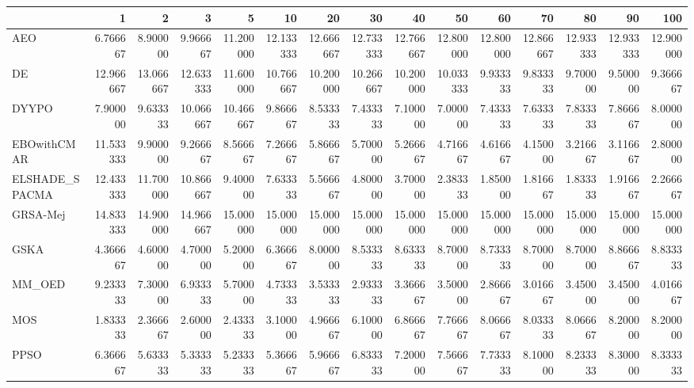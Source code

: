 \begin{tabular}{lrrrrrrrrrrrrrr}
\toprule
{} &        1   &        2   &        3   &        5   &        10  &        20  &        30  &        40  &        50  &        60  &        70  &        80  &        90  &        100 \\
\midrule
AEO            &   6.766667 &   8.900000 &   9.966667 &  11.200000 &  12.133333 &  12.666667 &  12.733333 &  12.766667 &  12.800000 &  12.800000 &  12.866667 &  12.933333 &  12.933333 &  12.900000 \\
DE             &  12.966667 &  13.066667 &  12.633333 &  11.600000 &  10.766667 &  10.200000 &  10.266667 &  10.200000 &  10.033333 &   9.933333 &   9.833333 &   9.700000 &   9.500000 &   9.366667 \\
DYYPO          &   7.900000 &   9.633333 &  10.066667 &  10.466667 &   9.866667 &   8.533333 &   7.433333 &   7.100000 &   7.000000 &   7.433333 &   7.633333 &   7.833333 &   7.866667 &   8.000000 \\
EBOwithCMAR    &  11.533333 &   9.900000 &   9.266667 &   8.566667 &   7.266667 &   5.866667 &   5.700000 &   5.266667 &   4.716667 &   4.616667 &   4.150000 &   3.216667 &   3.116667 &   2.800000 \\
ELSHADE\_SPACMA &  12.433333 &  11.700000 &  10.866667 &   9.400000 &   7.633333 &   5.566667 &   4.800000 &   3.700000 &   2.383333 &   1.850000 &   1.816667 &   1.833333 &   1.916667 &   2.266667 \\
GRSA-Mej       &  14.833333 &  14.900000 &  14.966667 &  15.000000 &  15.000000 &  15.000000 &  15.000000 &  15.000000 &  15.000000 &  15.000000 &  15.000000 &  15.000000 &  15.000000 &  15.000000 \\
GSKA           &   4.366667 &   4.600000 &   4.700000 &   5.200000 &   6.366667 &   8.000000 &   8.533333 &   8.633333 &   8.700000 &   8.733333 &   8.700000 &   8.700000 &   8.866667 &   8.833333 \\
MM\_OED         &   9.233333 &   7.300000 &   6.933333 &   5.700000 &   4.733333 &   3.533333 &   2.933333 &   3.366667 &   3.500000 &   2.866667 &   3.016667 &   3.450000 &   3.450000 &   4.016667 \\
MOS            &   1.833333 &   2.366667 &   2.600000 &   2.433333 &   3.100000 &   4.966667 &   6.100000 &   6.866667 &   7.766667 &   8.066667 &   8.033333 &   8.066667 &   8.200000 &   8.200000 \\
PPSO           &   6.366667 &   5.633333 &   5.333333 &   5.233333 &   5.366667 &   5.966667 &   6.833333 &   7.200000 &   7.566667 &   7.733333 &   8.100000 &   8.233333 &   8.300000 &   8.333333 \\

\end{tabular}
